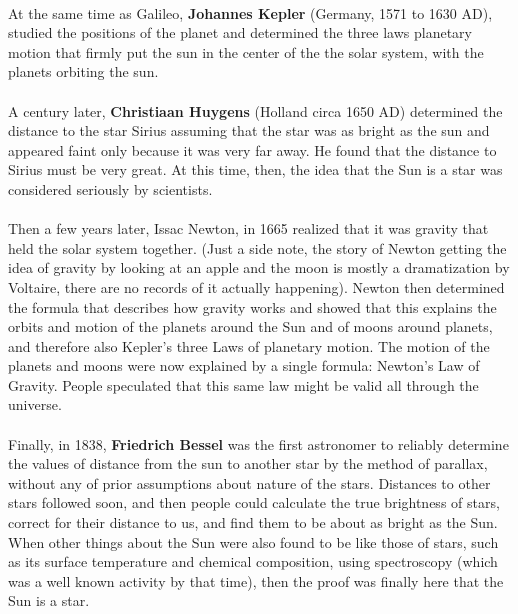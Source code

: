 \documentclass[a4paper,twoside]{article}
\numberwithin{equation}{section}
\begin{document}
\paragraph{}
At the same time as Galileo, \textbf{Johannes Kepler} (Germany, 1571 to 1630 AD), studied the positions of the planet and determined the three laws planetary motion that firmly put the sun in the center of the the solar system, with the planets orbiting the sun.
\paragraph{}
A century later, \textbf{Christiaan Huygens} (Holland circa 1650 AD) determined the distance to the star Sirius assuming that the star was as bright as the sun and appeared faint only because it was very far away. He found that the distance to Sirius must be very great. At this time, then, the idea that the Sun is a star was considered seriously by scientists.
\paragraph{}
Then a few years later, Issac Newton, in 1665 realized that it was gravity that held the solar system together. (Just a side note, the story of Newton getting the idea of gravity by looking at an apple and the moon is mostly a dramatization by Voltaire, there are no records of it actually happening). Newton then determined the formula that describes how gravity works and showed that this explains the orbits and motion of the planets around the Sun and of moons around planets, and therefore also Kepler's three Laws of planetary motion. The motion of the planets and moons were now explained by a single formula: Newton's Law of Gravity. People speculated that this same law might be valid all through the universe.
\paragraph{}
Finally, in 1838, \textbf{Friedrich Bessel} was the first astronomer to reliably determine the values of distance from the sun to another star by the method of parallax, without any of prior assumptions about nature of the stars. Distances to other stars followed soon, and then people could calculate the true brightness of stars, correct for their distance to us, and find them to be about as bright as the Sun. When other things about the Sun were also found to be like those of stars, such as its surface temperature and chemical composition, using spectroscopy (which was a well known activity by that time), then the proof was finally here that the Sun is a star.
\end{document}
